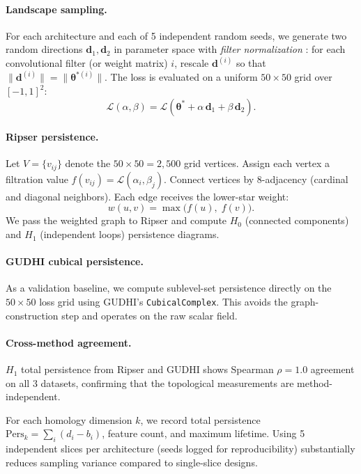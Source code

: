 \documentclass[10pt,twocolumn]{article}
\begin{document}
\paragraph{Landscape sampling.}
For each architecture and each of 5 independent random seeds, we generate two random directions $\mathbf{d}_1, \mathbf{d}_2$ in parameter space with \emph{filter normalization} \citep{li2018visualizing}: for each convolutional filter (or weight matrix) $i$, rescale $\mathbf{d}^{(i)}$ so that $\|\mathbf{d}^{(i)}\| = \|\boldsymbol{\theta}^{*(i)}\|$. The loss is evaluated on a uniform $50 \times 50$ grid over $[-1, 1]^2$:
\begin{equation}
    \mathcal{L}(\alpha, \beta) = \mathcal{L}\!\left(\boldsymbol{\theta}^* + \alpha\,\mathbf{d}_1 + \beta\,\mathbf{d}_2\right).
    \label{eq:landscape}
\end{equation}

\paragraph{Ripser persistence.}
Let $V = \{v_{ij}\}$ denote the $50 \times 50 = 2{,}500$ grid vertices. Assign each vertex a filtration value $f(v_{ij}) = \mathcal{L}(\alpha_i, \beta_j)$. Connect vertices by 8-adjacency (cardinal and diagonal neighbors). Each edge receives the lower-star weight:
\begin{equation}
    w(u,v) = \max\!\bigl(f(u),\; f(v)\bigr).
\end{equation}
We pass the weighted graph to Ripser \citep{bauer2021ripser} and compute $H_0$ (connected components) and $H_1$ (independent loops) persistence diagrams.

\paragraph{GUDHI cubical persistence.}
As a validation baseline, we compute sublevel-set persistence directly on the $50 \times 50$ loss grid using GUDHI's \texttt{CubicalComplex}. This avoids the graph-construction step and operates on the raw scalar field.

\paragraph{Cross-method agreement.}
$H_1$ total persistence from Ripser and GUDHI shows Spearman $\rho = 1.0$ agreement on all 3 datasets, confirming that the topological measurements are method-independent.

For each homology dimension $k$, we record total persistence $\text{Pers}_k = \sum_{i} (d_i - b_i)$, feature count, and maximum lifetime. Using 5 independent slices per architecture (seeds logged for reproducibility) substantially reduces sampling variance compared to single-slice designs.
\end{document}
